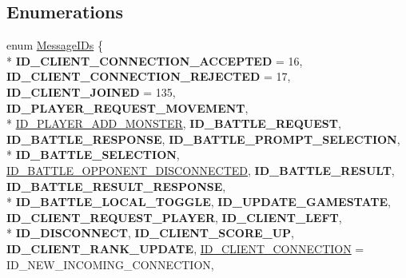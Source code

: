 \subsection*{Enumerations}
\begin{DoxyCompactItemize}
\item 
enum \hyperlink{namespace_champ_net_plugin_a2ade5cfa7cf6c25ab7236c6b54a57821}{Message\-I\-Ds} \{ \\*
{\bfseries I\-D\-\_\-\-C\-L\-I\-E\-N\-T\-\_\-\-C\-O\-N\-N\-E\-C\-T\-I\-O\-N\-\_\-\-A\-C\-C\-E\-P\-T\-E\-D} = 16, 
{\bfseries I\-D\-\_\-\-C\-L\-I\-E\-N\-T\-\_\-\-C\-O\-N\-N\-E\-C\-T\-I\-O\-N\-\_\-\-R\-E\-J\-E\-C\-T\-E\-D} = 17, 
{\bfseries I\-D\-\_\-\-C\-L\-I\-E\-N\-T\-\_\-\-J\-O\-I\-N\-E\-D} = 135, 
{\bfseries I\-D\-\_\-\-P\-L\-A\-Y\-E\-R\-\_\-\-R\-E\-Q\-U\-E\-S\-T\-\_\-\-M\-O\-V\-E\-M\-E\-N\-T}, 
\\*
\hyperlink{namespace_champ_net_plugin_a2ade5cfa7cf6c25ab7236c6b54a57821ad42c079bb7459dbaf419eeb2e845f3e2}{I\-D\-\_\-\-P\-L\-A\-Y\-E\-R\-\_\-\-A\-D\-D\-\_\-\-M\-O\-N\-S\-T\-E\-R}, 
{\bfseries I\-D\-\_\-\-B\-A\-T\-T\-L\-E\-\_\-\-R\-E\-Q\-U\-E\-S\-T}, 
{\bfseries I\-D\-\_\-\-B\-A\-T\-T\-L\-E\-\_\-\-R\-E\-S\-P\-O\-N\-S\-E}, 
{\bfseries I\-D\-\_\-\-B\-A\-T\-T\-L\-E\-\_\-\-P\-R\-O\-M\-P\-T\-\_\-\-S\-E\-L\-E\-C\-T\-I\-O\-N}, 
\\*
{\bfseries I\-D\-\_\-\-B\-A\-T\-T\-L\-E\-\_\-\-S\-E\-L\-E\-C\-T\-I\-O\-N}, 
\hyperlink{namespace_champ_net_plugin_a2ade5cfa7cf6c25ab7236c6b54a57821addd7d4ef5710787934d893be10785f0d}{I\-D\-\_\-\-B\-A\-T\-T\-L\-E\-\_\-\-O\-P\-P\-O\-N\-E\-N\-T\-\_\-\-D\-I\-S\-C\-O\-N\-N\-E\-C\-T\-E\-D}, 
{\bfseries I\-D\-\_\-\-B\-A\-T\-T\-L\-E\-\_\-\-R\-E\-S\-U\-L\-T}, 
{\bfseries I\-D\-\_\-\-B\-A\-T\-T\-L\-E\-\_\-\-R\-E\-S\-U\-L\-T\-\_\-\-R\-E\-S\-P\-O\-N\-S\-E}, 
\\*
{\bfseries I\-D\-\_\-\-B\-A\-T\-T\-L\-E\-\_\-\-L\-O\-C\-A\-L\-\_\-\-T\-O\-G\-G\-L\-E}, 
{\bfseries I\-D\-\_\-\-U\-P\-D\-A\-T\-E\-\_\-\-G\-A\-M\-E\-S\-T\-A\-T\-E}, 
{\bfseries I\-D\-\_\-\-C\-L\-I\-E\-N\-T\-\_\-\-R\-E\-Q\-U\-E\-S\-T\-\_\-\-P\-L\-A\-Y\-E\-R}, 
{\bfseries I\-D\-\_\-\-C\-L\-I\-E\-N\-T\-\_\-\-L\-E\-F\-T}, 
\\*
{\bfseries I\-D\-\_\-\-D\-I\-S\-C\-O\-N\-N\-E\-C\-T}, 
{\bfseries I\-D\-\_\-\-C\-L\-I\-E\-N\-T\-\_\-\-S\-C\-O\-R\-E\-\_\-\-U\-P}, 
{\bfseries I\-D\-\_\-\-C\-L\-I\-E\-N\-T\-\_\-\-R\-A\-N\-K\-\_\-\-U\-P\-D\-A\-T\-E}, 
\hyperlink{namespace_champ_net_plugin_a2ade5cfa7cf6c25ab7236c6b54a57821aecc0564c52e3106cfe012e5533b080da}{I\-D\-\_\-\-C\-L\-I\-E\-N\-T\-\_\-\-C\-O\-N\-N\-E\-C\-T\-I\-O\-N} = I\-D\-\_\-\-N\-E\-W\-\_\-\-I\-N\-C\-O\-M\-I\-N\-G\-\_\-\-C\-O\-N\-N\-E\-C\-T\-I\-O\-N, 

\end{DoxyCompactItemize}
